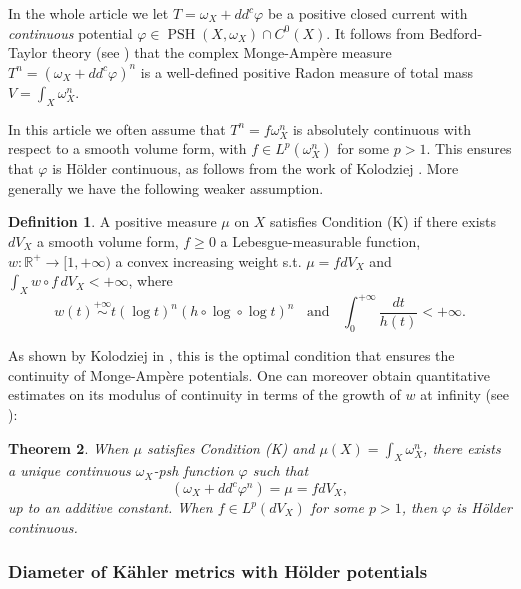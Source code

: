 \documentclass[a4paper,11pt,leqno,english]{smfart}
\theoremstyle{plain}
\newtheorem{thm}{Theorem}[section]
\theoremstyle{plain}
\numberwithin{equation}{section} %
\numberwithin{figure}{section} %
\theoremstyle{plain}
\theoremstyle{plain}
\theoremstyle{remark}
\theoremstyle{remark}
\theoremstyle{definition}
\theoremstyle{plain}
\theoremstyle{plain}
\theoremstyle{definition}
\newtheorem{defi}[thm]{Definition}
\newcommand{\R}{{\mathbb{R}}}
\newcommand{\f}{\varphi}
\newcommand{\PSH}{\operatorname{PSH}}
\begin{document}
 In the whole article we let $T=\omega_X+dd^c \f$ be a positive closed current with {\it continuous}
 potential $\f \in \PSH(X,\omega_X)\cap C^0(X)$.
 It follows from Bedford-Taylor theory
 (see \cite{GZbook}) that the complex Monge-Amp\`ere measure 
 $T^n=(\omega_X+dd^c \f)^n$ is a well-defined positive Radon measure of
 total mass $V=\int_X \omega_X^n$.
 
 In this article we often assume that $T^n=f \omega_X^n$ is absolutely continuous
 with respect to a smooth volume form, with $f \in L^p(\omega_X^n)$ for some $p>1$.
 This ensures that $\f$ is H\"older continuous,
 as follows from the work of Kolodziej \cite{Kol08}.
  More generally we have the following weaker assumption.
 
  \begin{defi}
  A  positive  measure $\mu$ on $X$ satisfies Condition (K) if there exists 
    $dV_X$  a  smooth volume form, $f \geq 0$  a Lebesgue-measurable function,
$w: \R^+ \rightarrow  [1,+\infty)$ 
 a convex increasing weight 
 s.t. $\mu=f dV_X$ and $\int_X w \circ f \, dV_X <+\infty$,
 where
 $$
 w(t) \stackrel{+\infty}{\sim} t (\log t)^n (h \circ \log \circ \log t)^n 
 \; \; \text{ and } \; \;
 \int_0^{+\infty} \frac{dt}{h(t)}<+\infty.
 $$
  \end{defi}
  
  As shown by Kolodziej in \cite[Theorem 2.5.2]{Kol98},
  this is the optimal condition that ensures the continuity
  of Monge-Amp\`ere potentials.
     One can moreover obtain quantitative estimates
  on its modulus of continuity in terms of the growth of $w$ at infinity
  (see \cite{Kol08,DDGHKZ14,GPTW21,GGZ25}):
  
  \begin{thm} \label{thm:kolo}
  When $\mu$ satisfies Condition (K) and $\mu(X)=\int_X \omega_X^n$, 
  there exists a unique continuous $\omega_X$-psh function $\f$ such that
  $$
  (\omega_X+dd^c \f^n)=\mu=fdV_X,
  $$
  up to an additive constant.   When $f \in L^p(dV_X)$ for some $p>1$, then  $\f$ is H\"older continuous.
  \end{thm}
  

 
  
  
  
  
  
 \subsubsection{Diameter of K\"ahler metrics with H\"older potentials}\label{sec-diam-bd}
  
\end{document}
